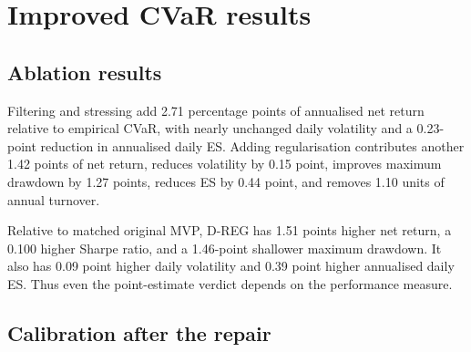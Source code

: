 \documentclass[11pt,a4paper]{article}
\begin{document}
\section{Improved CVaR results}

\subsection{Ablation results}

\begin{table}[H]
\centering
\caption{Post-2021 improved-CVaR ablation; all optimisers matched}
\label{tab:improved}
\end{table}

Filtering and stressing add 2.71 percentage points of annualised net return relative to empirical CVaR, with nearly unchanged daily volatility and a 0.23-point reduction in annualised daily ES. Adding regularisation contributes another 1.42 points of net return, reduces volatility by 0.15 point, improves maximum drawdown by 1.27 points, reduces ES by 0.44 point, and removes 1.10 units of annual turnover.

Relative to matched original MVP, D-REG has 1.51 points higher net return, a 0.100 higher Sharpe ratio, and a 1.46-point shallower maximum drawdown. It also has 0.09 point higher daily volatility and 0.39 point higher annualised daily ES. Thus even the point-estimate verdict depends on the performance measure.

\subsection{Calibration after the repair}
\end{document}
